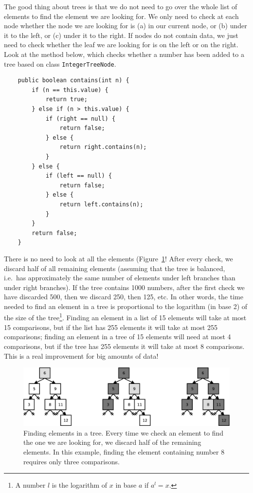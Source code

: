 The good thing about trees is that we do not need to go over the whole
list of elements to find the element we are looking for. We only need
to check at each node whether the node we are looking for is (a) in our
current node, or (b) under it to the left, or (c) under it to the right. If
nodes do not contain data, we just need to check whether the leaf we
are looking for is on the left or on the right. Look at the method
below, which checks whether a number has been added to a tree based on
class \verb+IntegerTreeNode+. 

\begin{verbatim}
    public boolean contains(int n) {
        if (n == this.value) {
            return true;
        } else if (n > this.value) {
            if (right == null) {
                return false;
            } else {
                return right.contains(n);
            }
        } else {
            if (left == null) {
                return false;
            } else {
                return left.contains(n);
            }
        }
        return false;
    }
\end{verbatim}

There is no need to look at all the elements
(Figure~\ref{fig:fhsdhshgfhjsdg}! After every check, we
discard half of all remaining elements (assuming that the tree is
balanced, i.e.~has approximately the same number of elements under left
branches than under right branches). If the tree contains 1000
numbers, after the first check we have discarded 500, then we discard
250, then 125, etc. In other words, the time needed to find an element
in a tree is proportional to the logarithm (in base 2) of the size of
the tree\footnote{A number $l$ is the logarithm of $x$ in base $a$ if
 $a^l = x$.}. Finding an element in a list of 15 elements will take at
most 15 comparisons, but if the list has 255 elements it will take at
most 255 comparisons; finding an element in a tree of 15 elements will
need at most 4 comparisons, but if the tree has 255 elements it will
take at most 8 comparisons. This is a real improvement for big amounts
of data!

\begin{figure}[hbtp]
  \centering
  \includegraphics[width=\textwidth]{gfx/tree-find}
  \caption{Finding elements in a tree. Every time we check an element
    to find the one we are looking for, we discard half of the
    remaining elements. In this example, finding the element
    containing number 8 requires only three comparisons.}
  \label{fig:fhsdhshgfhjsdg}
\end{figure}

